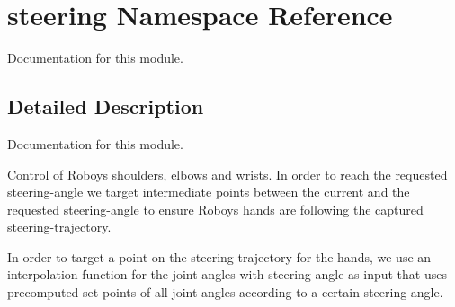 \hypertarget{namespacesteering}{}\section{steering Namespace Reference}
\label{namespacesteering}


Documentation for this module.  




\subsection{Detailed Description}
Documentation for this module. 

Control of Roboys\textquotesingle{} shoulders, elbows and wrists. In order to reach the requested steering-\/angle we target intermediate points between the current and the requested steering-\/angle to ensure Roboys\textquotesingle{} hands are following the captured steering-\/trajectory.

In order to target a point on the steering-\/trajectory for the hands, we use an interpolation-\/function for the joint angles with steering-\/angle as input that uses precomputed set-\/points of all joint-\/angles according to a certain steering-\/angle. 